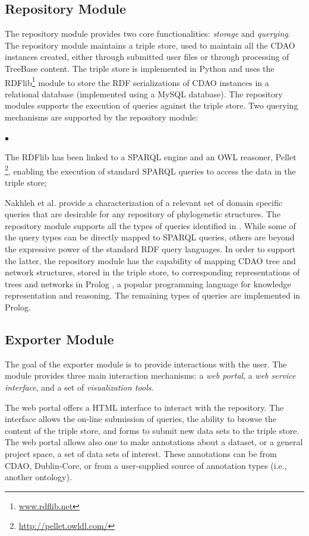 \documentclass[10pt]{bmc_article}
\newenvironment{bmcformat}{\fussy\setboolean{publ}{true}}{\fussy}
\begin{document}
\begin{bmcformat}
\subsection*{Repository Module}
The repository module provides two core functionalities: \emph{storage} and \emph{querying}. 
The repository module maintains a triple store, used to maintain all the CDAO instances created, either
through submitted user files or through processing of TreeBase content. The triple store is implemented in 
Python and uses the RDFlib\footnote{\url{www.rdflib.net}} module to store the RDF serializations of
CDAO instances in a relational database (implemented using
a MySQL database). The repository modules supports the execution of queries
against the triple store. Two querying mechanisms are supported by the repository module:
\begin{list}{$\bullet$}{\topsep=1pt \parsep=0pt \itemsep=1pt}
\item The RDFlib has been linked to a SPARQL \cite{sparql} engine and an 
	OWL reasoner, Pellet \footnote{\url{http://pellet.owldl.com/}}, enabling the execution of
	standard SPARQL queries to access the data in the triple store; 
\item Nakhleh et al. \cite{queries} provide a characterization of a relevant set of domain specific
	queries that are desirable for any repository of phylogenetic structures. The repository module
	supports all the types of queries identified in \cite{queries}. While some of the query types 
	can be directly mapped to SPARQL queries, others are beyond the expressive power of the
	standard RDF query languages. In order to support the latter, the repository module has the 
	capability of mapping CDAO tree and network structures, stored in the triple store, to corresponding
	representations of trees and networks in Prolog \cite{prolog}, a popular programming language for 
	knowledge representation and reasoning. The remaining types of queries are implemented in 
	Prolog.  
\end{list}

\subsection*{Exporter Module}
The goal of the exporter module is to provide interactions with the user. The module provides three main
interaction mechanisms: a \emph{web portal}, a \emph{web service interface}, and a set of
\emph{visualization tools}.

The web portal offers a HTML interface to interact with the repository. The interface allows the on-line
submission of queries,  the ability to browse the content of the triple store, and forms to submit
new data sets to the triple store. The web portal allows also  one to make annotations 
about a dataset, or a general project space,
a set of data sets of interest. These annotations can be from CDAO, Dublin-Core, or from a user-supplied source of
annotation types (i.e., another ontology).


\end{bmcformat}
\end{document}
